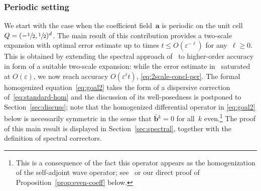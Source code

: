 \documentclass[10pt]{amsart}
\theoremstyle{plain}
\theoremstyle{definition}
\numberwithin{equation}{section}
\newcommand{\e}{\varepsilon}
\newcommand{\Aa}{\boldsymbol a}
\newcommand{\bb}{{\boldsymbol b}}
\begin{document}
\subsubsection{Periodic setting}
We start with the case when the coefficient field~$\Aa$ is periodic on the unit cell $Q=(-\sfrac12,\sfrac12)^d$. {The main result of this contribution provides} a two-scale expansion with optimal error estimate up to times $t\le O(\e^{-\ell})$ for any~$\ell\ge0$.
This is obtained by extending the spectral approach of~\cite{BG} to higher-order accuracy in form of a suitable two-scale expansion: while the error estimate in~\cite{BG} saturated at $O(\e)$, we now reach accuracy $O(\e^\ell t)$, \cf \eqref{eq:2scale-concl-per}.
The formal homogenized equation~\eqref{eq:goal2} takes the form of a dispersive correction of~\eqref{eq:standard-hom} and the discussion of its well-posedness is postponed to Section~\ref{sec:discuss}; note that the homogenized differential operator {in \eqref{eq:goal2} below} is necessarily symmetric in the sense that $\bar\bb{}^{k}=0$ for all~$k$ even.\footnote{This is a consequence of the fact this operator appears as the homogenization of the self-adjoint wave operator; see~\cite[Prop.\,1]{BG} or our direct proof of Proposition~\ref{prop:even-coeff} below.}
The proof of this main result is displayed in Section~\ref{sec:spectral}, together with the definition of spectral correctors.
\end{document}
